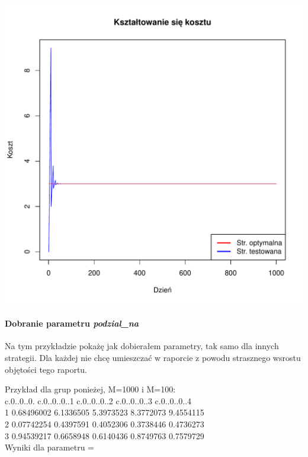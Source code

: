 \documentclass{article}
\begin{document}
\begin{center}
\includegraphics[scale=0.52]{wykresy/problemy/Ksztaltowanie_sie_kosztu_troche_za_maly.pdf}
\end{center}
\paragraph{Dobranie parametru \textit{podzial\_na}}
Na tym przykładzie pokażę jak dobierałem parametry, tak samo dla innych strategii. Dla każdej
nie chcę umieszczać w raporcie z powodu strasznego wsrostu objętości tego raportu.

Przykład dla grup ponieżej, M=1000 i M=100:\\
c.0..0..0. c.0..0..0..1 c.0..0..0..2 c.0..0..0..3 c.0..0..0..4\\
1 0.68496002    6.1336505    5.3973523    8.3772073    9.4554115\\
2 0.07742254    0.4397591    0.4052306    0.3738446    0.4736273\\
3 0.94539217    0.6658948    0.6140436    0.8749763    0.7579729\\

Wyniki dla parametru = 
\end{document}
